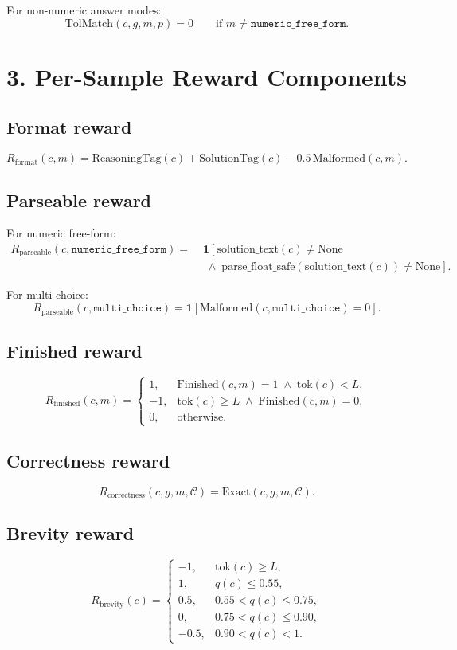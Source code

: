 \documentclass[11pt]{article}
\newcommand{\ind}{\mathbf{1}}
\newcommand{\None}{\mathrm{None}}
\begin{document}
For non-numeric answer modes:
\[
\mathrm{TolMatch}(c,g,m,p) = 0 \qquad \text{if } m \neq \texttt{numeric\_free\_form}.
\]

\section*{3. Per-Sample Reward Components}

\subsection*{Format reward}
\[
R_{\mathrm{format}}(c,m)
=
\mathrm{ReasoningTag}(c)
+
\mathrm{SolutionTag}(c)
-
0.5\,\mathrm{Malformed}(c,m).
\]

\subsection*{Parseable reward}
For numeric free-form:
\[
\begin{aligned}
R_{\mathrm{parseable}}(c,\texttt{numeric\_free\_form})
=\;&\ind\!\left[
\mathrm{solution\_text}(c)\neq \None \right. \\
&\left. \;\wedge\;
\mathrm{parse\_float\_safe}(\mathrm{solution\_text}(c))\neq \None
\right].
\end{aligned}
\]

For multi-choice:
\[
R_{\mathrm{parseable}}(c,\texttt{multi\_choice})
=
\ind\!\left[
\mathrm{Malformed}(c,\texttt{multi\_choice})=0
\right].
\]

\subsection*{Finished reward}
\[
R_{\mathrm{finished}}(c,m)
=
\begin{cases}
1, & \mathrm{Finished}(c,m)=1 \;\wedge\; \mathrm{tok}(c)<L, \\
-1, & \mathrm{tok}(c)\ge L \;\wedge\; \mathrm{Finished}(c,m)=0, \\
0, & \text{otherwise.}
\end{cases}
\]

\subsection*{Correctness reward}
\[
R_{\mathrm{correctness}}(c,g,m,\mathcal{C})
=
\mathrm{Exact}(c,g,m,\mathcal{C}).
\]

\subsection*{Brevity reward}
\[
R_{\mathrm{brevity}}(c)
=
\begin{cases}
-1, & \mathrm{tok}(c)\ge L, \\
1, & q(c)\le 0.55, \\
0.5, & 0.55 < q(c)\le 0.75, \\
0, & 0.75 < q(c)\le 0.90, \\
-0.5, & 0.90 < q(c)<1.
\end{cases}
\]
\end{document}
